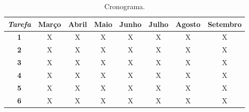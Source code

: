 \begin{table}
\begin{center}
\begin{small}
\begin{tabular}{|c|c|c|c|c|c|c|c|} 
\hline
\emph{Tarefa} &
Março & 
Abril & 
Maio &  
Junho & 
Julho &
Agosto & 
Setembro \\ \hline
\textbf{1} & X & X & X & X & X & X & X \\ \hline 
\textbf{2} & X & X & X & X & X & X & X \\ \hline 
\textbf{3} & X & X & X & X & X & X & X \\ \hline 
\textbf{4} & X & X & X & X & X & X & X \\ \hline 
\textbf{5} & X & X & X & X & X & X & X \\ \hline 
\textbf{6} & X & X & X & X & X & X & X \\ \hline 
\end{tabular}
\caption{Cronograma.}
\label{tab:tab:F5}
\end{small}
\end{center}
\end{table}